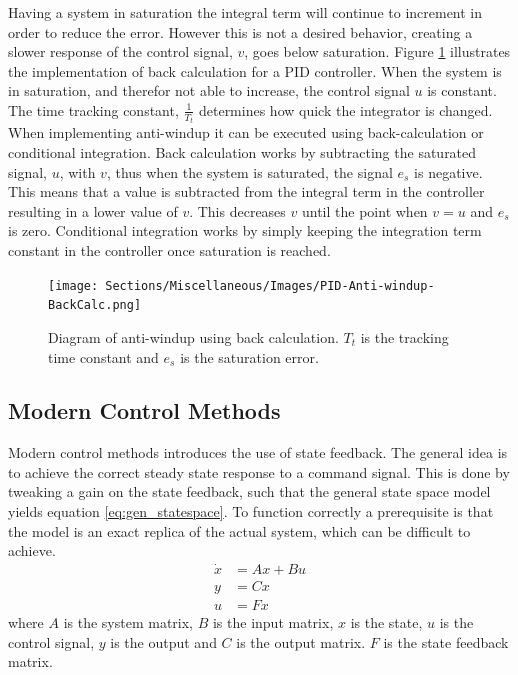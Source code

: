 \documentclass[../../main.tex]{subfiles}
\begin{document}
Having a system in saturation the integral term will continue to increment in order to reduce the error. However this is not a desired behavior, creating a slower response of the control signal, $v$, goes below saturation. Figure \ref{fig:anti-windup} illustrates the implementation of back calculation for a PID controller. When the system is in saturation, and therefor not able to increase, the control signal $u$ is constant. The time tracking constant, $\frac{1}{T_t}$ determines how quick the integrator is changed. When implementing anti-windup it can be executed using back-calculation or conditional integration. Back calculation works by subtracting the saturated signal, $u$, with $v$, thus when the system is saturated, the signal $e_s$ is negative. This means that a value is subtracted from the integral term in the controller resulting in a lower value of $v$. This decreases $v$ until the point when $v=u$ and $e_s$ is zero. Conditional integration works by simply keeping the integration term constant in the controller once saturation is reached. 

\begin{figure}
    \centering
    \texttt{[image: Sections/Miscellaneous/Images/PID-Anti-windup-BackCalc.png]}
    \caption{Diagram of anti-windup using back calculation. $T_t$ is the tracking time constant and $e_s$ is the saturation error.}
    \label{fig:anti-windup}
\end{figure}

\subsection*{Modern Control Methods}
Modern control methods introduces the use of state feedback. The general idea is to achieve the correct steady state response to a command signal. This is done by tweaking a gain on the state feedback, such that the general state space model yields equation \ref{eq:gen_statespace}. To function correctly a prerequisite is that the model is an exact replica of the actual system, which can be difficult to achieve.
\begin{equation}\label{eq:gen_statespace}
    \begin{split}
        \Dot{x}&=Ax+Bu \\
        y&=Cx \\
        u&=Fx
    \end{split}
\end{equation}
where $A$ is the system matrix, $B$ is the input matrix, $x$ is the state, $u$ is the control signal, $y$ is the output and $C$ is the output matrix. $F$ is the state feedback matrix. 
\end{document}
